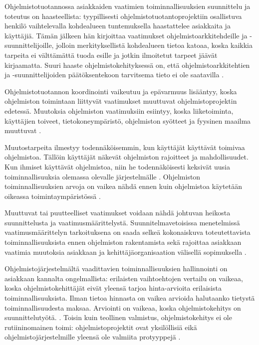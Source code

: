 \documentclass[finnish]{tktltiki2}
\theoremstyle{definition}
\theoremstyle{remark}
\begin{document}
Ohjelmistotuotannossa asiakkaiden vaatimien toiminnallisuuksien suunnittelu ja toteutus on haasteellista: tyypillisesti ohjelmistotuotantoprojektiin osallistuva henkilö vaihtelevalla kohdealueen tuntemuksella haastattelee asiakkaita ja käyttäjiä. Tämän jälkeen hän kirjoittaa vaatimukset ohjelmistoarkkitehdeille ja -suunnittelijoille, jolloin merkityksellistä kohdealueen tietoa katoaa, koska kaikkia tarpeita ei välttämättä tuoda esille ja jotkin ilmoitetut tarpeet jäävät kirjaamatta. Suuri haaste ohjelmistokehityksessä on, että ohjelmistoarkkitehtien ja -suunnittelijoiden päätöksentekoon tarvitsema tieto ei ole saatavilla \cite{KES95}.

Ohjelmistotuotannon koordinointi vaikeutuu ja epävarmuus lisääntyy, koska ohjelmiston toimintaan liittyvät vaatimukset muuttuvat ohjelmistoprojektin edetessä. Muutoksia ohjelmiston vaatimuksiin esiintyy, koska liiketoiminta, käyttäjien toiveet, tietokoneympäristö, ohjelmiston syötteet ja fyysinen maailma muuttuvat \cite{KES95}.

Muutostarpeita ilmestyy todennäköisemmin, kun käyttäjät käyttävät toimivaa ohjelmistoa. Tällöin käyttäjät näkevät ohjelmiston rajoitteet ja mahdollisuudet. Kun ihmiset käyttävät ohjelmistoa, niin he todennäköisesti keksivät uusia toiminnallisuuksia olemassa olevalle järjestelmälle \cite{KES95}. Ohjelmiston toiminnallisuuksien arvoja on vaikea nähdä ennen kuin ohjelmistoa käytetään oikeassa toimintaympäristössä \cite{FOW01a}.

Muuttuvat tai puutteelliset vaatimukset voidaan nähdä johtuvan heikosta suunnittelusta ja vaatimusmäärittelystä. Suunnitelmavetoisissa menetelmissä vaatimusmäärittelyn tarkoituksena on saada selkeä kokonaiskuva toteutettavista toiminnallisuuksista ennen ohjelmiston rakentamista sekä rajoittaa asiakkaan vaatimia muutoksia asiakkaan ja kehittäjäorganisaation välisellä sopimuksella \cite{FOW01a}.

Ohjelmistojärjestelmältä vaadittavien toiminnallisuuksien hallinnointi on asiakkaan kannalta ongelmallista: erilaisten vaihtoehtojen vertailu on vaikeaa, koska ohjelmistokehittäjät eivät yleensä tarjoa hinta-arvioita erilaisista toiminnallisuuksista. Ilman tietoa hinnasta on vaikea arvioida halutaanko tietystä toiminnallisuudesta maksaa. Arviointi on vaikeaa, koska ohjelmistokehitys on suunnittelutyötä. \cite{FOW01a}. Toisin kuin teollinen valmistus, ohjelmistokehitys ei ole rutiininomainen toimi: ohjelmistoprojektit ovat yksilöllisiä eikä ohjelmistojärjestelmille yleensä ole valmiita protyyppejä \cite{KES95}.
\end{document}
